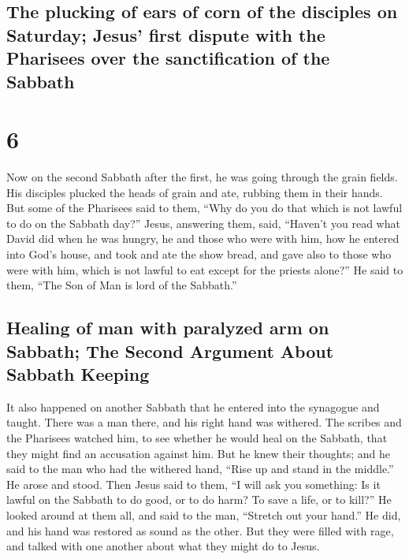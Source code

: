 \begin{paracol}{2}
\switchcolumn
\begin{otherlanguage}{english}

\hypertarget{the-plucking-of-ears-of-corn-of-the-disciples-on-saturday-jesus-first-dispute-with-the-pharisees-over-the-sanctification-of-the-sabbath}{%
\subsection{The plucking of ears of corn of the disciples on Saturday;
Jesus' first dispute with the Pharisees over the sanctification of the
Sabbath}\label{the-plucking-of-ears-of-corn-of-the-disciples-on-saturday-jesus-first-dispute-with-the-pharisees-over-the-sanctification-of-the-sabbath}}

\hypertarget{section-11}{%
\section{6}\label{section-11}}

 Now on the second Sabbath after the first, he was going
through the grain fields. His disciples plucked the heads of grain and
ate, rubbing them in their hands.  But some of the
Pharisees said to them, ``Why do you do that which is not lawful to do
on the Sabbath day?''  Jesus, answering them, said,
``Haven't you read what David did when he was hungry, he and those who
were with him,  how he entered into God's house, and took
and ate the show bread, and gave also to those who were with him, which
is not lawful to eat except for the priests alone?''  He
said to them, ``The Son of Man is lord of the Sabbath.''

\hypertarget{healing-of-man-with-paralyzed-arm-on-sabbath-the-second-argument-about-sabbath-keeping}{%
\subsection{Healing of man with paralyzed arm on Sabbath; The Second
Argument About Sabbath
Keeping}\label{healing-of-man-with-paralyzed-arm-on-sabbath-the-second-argument-about-sabbath-keeping}}

 It also happened on another Sabbath that he entered into
the synagogue and taught. There was a man there, and his right hand was
withered.  The scribes and the Pharisees watched him, to
see whether he would heal on the Sabbath, that they might find an
accusation against him.  But he knew their thoughts; and
he said to the man who had the withered hand, ``Rise up and stand in the
middle.'' He arose and stood.  Then Jesus said to them,
``I will ask you something: Is it lawful on the Sabbath to do good, or
to do harm? To save a life, or to kill?''  He looked
around at them all, and said to the man, ``Stretch out your hand.'' He
did, and his hand was restored as sound as the other. 
But they were filled with rage, and talked with one another about what
they might do to Jesus.


\end{otherlanguage}
\end{paracol}
